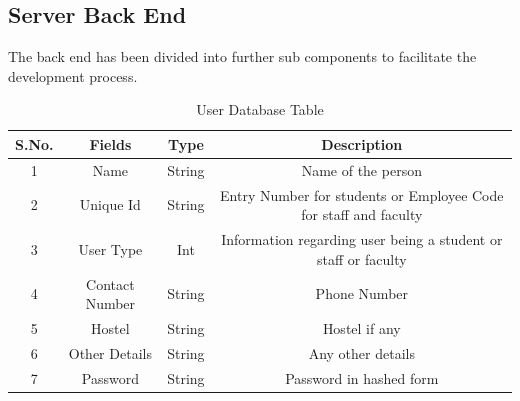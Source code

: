 \documentclass{article}
\begin{document}
			\subsection{Server Back End}
				The back end has been divided into further sub components to facilitate the development process.
					\begin{table}[]
\centering
\caption{User Database Table}
\label{my-label}
\begin{tabular}{|c|c|c|c|}
\hline
\textbf{S.No.} & \textbf{Fields} & \textbf{Type} & \textbf{Description}                                             \\ \hline
1              & Name            & String        & Name of the person                                               \\ \hline
2              & Unique Id       & String        & Entry Number for students or Employee Code for staff and faculty \\ \hline
3              & User Type       & Int           & Information regarding user being a student or staff or faculty   \\ \hline
4              & Contact Number  & String        & Phone Number                                                     \\ \hline
5              & Hostel          & String        & Hostel if any                                                    \\ \hline
6              & Other Details   & String        & Any other details                                                \\ \hline
7              & Password	 	 & String        & Password in hashed form                                          \\ \hline
\end{tabular}
\end{table}
\end{document}
